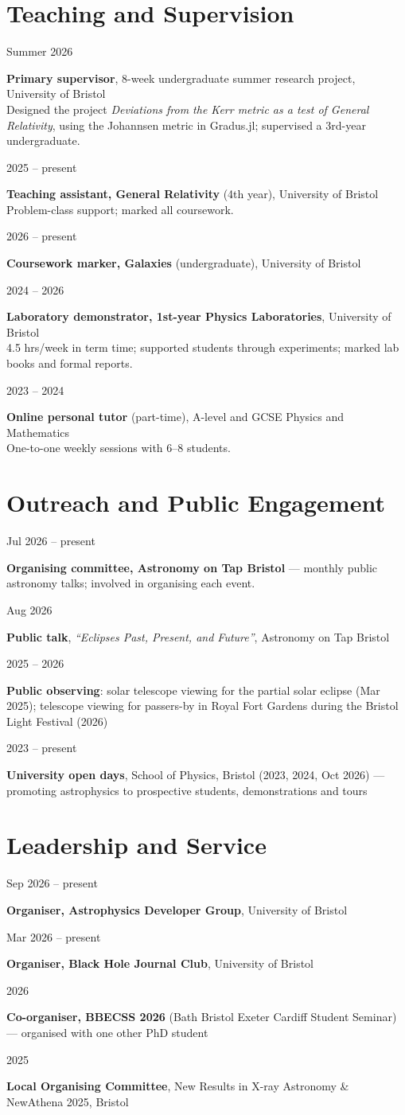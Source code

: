 \documentclass[10pt,a4paper]{article}
\newcommand{\datewidth}{2.7cm}
\newcommand{\entry}[2]{%
  \par\noindent
  \begin{minipage}[t]{\datewidth}\raggedright\leavevmode\small\color{muted}\strut#1\end{minipage}%
  \hspace{0.4cm}%
  \begin{minipage}[t]{\dimexpr\textwidth-\datewidth-0.4cm\relax}\strut#2\strut\end{minipage}%
  \par\vspace{0.3em}}
\begin{document}
\section{Teaching and Supervision}
\entry{Summer 2026}{%
  \textbf{Primary supervisor}, 8-week undergraduate summer research project, University of Bristol\\
  Designed the project \emph{Deviations from the Kerr metric as a test of General Relativity},
  using the Johannsen metric in Gradus.jl; supervised a 3rd-year undergraduate.}
\entry{2025 -- present}{%
  \textbf{Teaching assistant, General Relativity} (4th year), University of Bristol\\
  Problem-class support; marked all coursework.}
\entry{2026 -- present}{%
  \textbf{Coursework marker, Galaxies} (undergraduate), University of Bristol}
\entry{2024 -- 2026}{%
  \textbf{Laboratory demonstrator, 1st-year Physics Laboratories}, University of Bristol\\
  4.5 hrs/week in term time; supported students through experiments; marked lab books and formal reports.}
\entry{2023 -- 2024}{%
  \textbf{Online personal tutor} (part-time), A-level and GCSE Physics and Mathematics\\
  One-to-one weekly sessions with 6--8 students.}
 
\section{Outreach and Public Engagement}
\entry{Jul 2026 -- present}{\textbf{Organising committee, Astronomy on Tap Bristol} ---
  monthly public astronomy talks; involved in organising each event.}
\entry{Aug 2026}{\textbf{Public talk}, \emph{``Eclipses Past, Present, and Future''}, Astronomy on Tap Bristol}
\entry{2025 -- 2026}{\textbf{Public observing}: solar telescope viewing for the partial solar eclipse
  (Mar 2025); telescope viewing for passers-by in Royal Fort Gardens during the Bristol Light Festival (2026)}
\entry{2023 -- present}{\textbf{University open days}, School of Physics, Bristol (2023, 2024, Oct 2026) ---
  promoting astrophysics to prospective students, demonstrations and tours}
 
\section{Leadership and Service}
\entry{Sep 2026 -- present}{\textbf{Organiser, Astrophysics Developer Group}, University of Bristol}
\entry{Mar 2026 -- present}{\textbf{Organiser, Black Hole Journal Club}, University of Bristol}
\entry{2026}{\textbf{Co-organiser, BBECSS 2026} (Bath Bristol Exeter Cardiff Student Seminar) ---
  organised with one other PhD student}
\entry{2025}{\textbf{Local Organising Committee}, New Results in X-ray Astronomy \& NewAthena 2025, Bristol}
 
\end{document}
